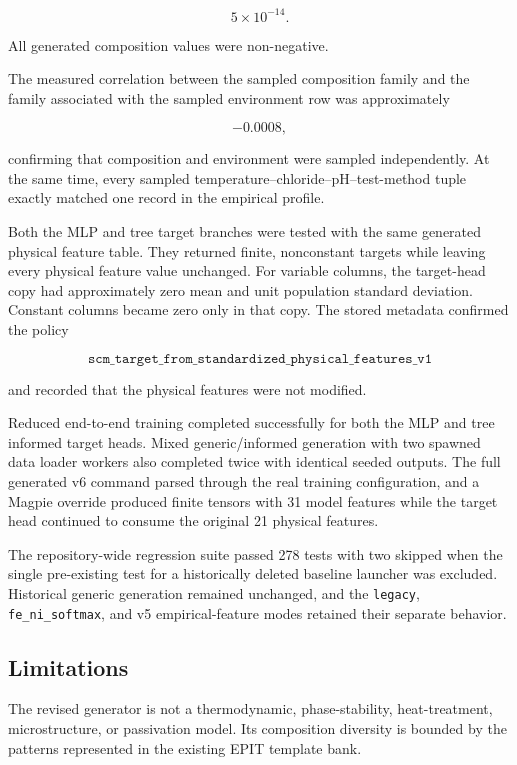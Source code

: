 \documentclass{article}
\begin{document}
\[
5\times10^{-14}.
\]

All generated composition values were non-negative.

The measured correlation between the sampled composition family and the family
associated with the sampled environment row was approximately

\[
-0.0008,
\]

confirming that composition and environment were sampled independently. At the
same time, every sampled temperature--chloride--pH--test-method tuple exactly
matched one record in the empirical profile.

Both the MLP and tree target branches were tested with the same generated
physical feature table. They returned finite, nonconstant targets while leaving
every physical feature value unchanged. For variable columns, the target-head
copy had approximately zero mean and unit population standard deviation.
Constant columns became zero only in that copy. The stored metadata confirmed
the policy

\[
\texttt{scm\_target\_from\_standardized\_physical\_features\_v1}
\]

and recorded that the physical features were not modified.

Reduced end-to-end training completed successfully for both the MLP and tree
informed target heads. Mixed generic/informed generation with two spawned data
loader workers also completed twice with identical seeded outputs. The full
generated v6 command parsed through the real training configuration, and a
Magpie override produced finite tensors with 31 model features while the target
head continued to consume the original 21 physical features.

The repository-wide regression suite passed 278 tests with two skipped when the
single pre-existing test for a historically deleted baseline launcher was
excluded. Historical generic generation remained unchanged, and the
\texttt{legacy}, \texttt{fe\_ni\_softmax}, and v5 empirical-feature modes
retained their separate behavior.

\subsection{Limitations}

The revised generator is not a thermodynamic, phase-stability, heat-treatment,
microstructure, or passivation model. Its composition diversity is bounded by
the patterns represented in the existing EPIT template bank.
\end{document}
